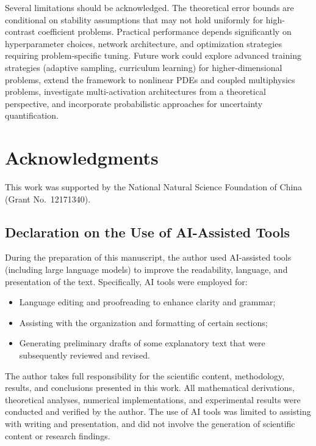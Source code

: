 \documentclass{article}
\begin{document}
Several limitations should be acknowledged. The theoretical error bounds are conditional on stability assumptions that may not hold uniformly for high-contrast coefficient problems. Practical performance depends significantly on hyperparameter choices, network architecture, and optimization strategies requiring problem-specific tuning. Future work could explore advanced training strategies (adaptive sampling, curriculum learning) for higher-dimensional problems, extend the framework to nonlinear PDEs and coupled multiphysics problems, investigate multi-activation architectures from a theoretical perspective, and incorporate probabilistic approaches for uncertainty quantification.

\section{Acknowledgments}

This work was supported by the National Natural Science Foundation of China (Grant No.~12171340). 

\subsection*{Declaration on the Use of AI-Assisted Tools}

During the preparation of this manuscript, the author used AI-assisted tools (including large language models) to improve the readability, language, and presentation of the text. Specifically, AI tools were employed for:
\begin{itemize}
    \item Language editing and proofreading to enhance clarity and grammar;
    \item Assisting with the organization and formatting of certain sections;
    \item Generating preliminary drafts of some explanatory text that were subsequently reviewed and revised.
\end{itemize}
The author takes full responsibility for the scientific content, methodology, results, and conclusions presented in this work. All mathematical derivations, theoretical analyses, numerical implementations, and experimental results were conducted and verified by the author. The use of AI tools was limited to assisting with writing and presentation, and did not involve the generation of scientific content or research findings.



\end{document}

